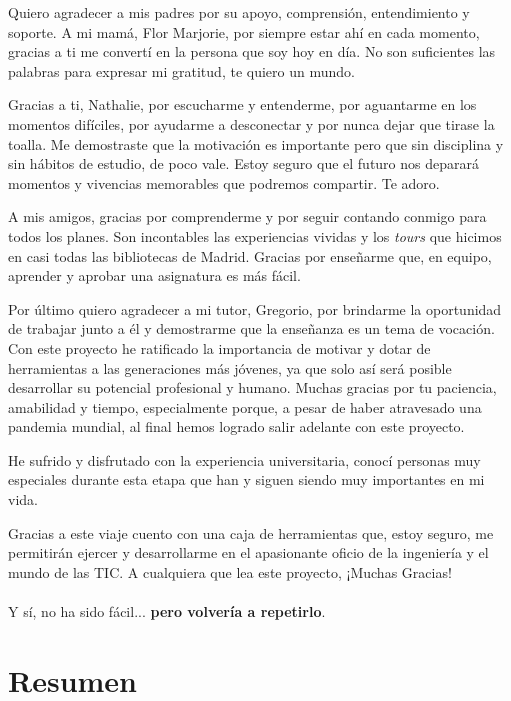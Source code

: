 \documentclass[a4paper, 12pt]{book}
\begin{document}
Quiero agradecer a mis padres por su apoyo, comprensión, entendimiento y soporte. A mi mamá, Flor Marjorie, por siempre estar ahí en cada momento, gracias a ti me convertí en la persona que soy hoy en día. No son suficientes las palabras para expresar mi gratitud, te quiero un mundo. 

Gracias a ti, Nathalie, por escucharme y entenderme, por aguantarme en los momentos difíciles, por ayudarme a desconectar y por nunca dejar que tirase la toalla. Me demostraste que la motivación es importante pero que sin disciplina y sin hábitos de estudio, de poco vale. Estoy seguro que el futuro nos deparará momentos y vivencias memorables que podremos compartir. Te adoro.

A mis amigos, gracias por comprenderme y por seguir contando conmigo para todos los planes. Son incontables las experiencias vividas y los \textit{tours} que hicimos en casi todas las bibliotecas de Madrid. Gracias por enseñarme que, en equipo, aprender y aprobar una asignatura es más fácil.

Por último quiero agradecer a mi tutor, Gregorio, por brindarme la oportunidad de trabajar junto a él y demostrarme que la enseñanza es un tema de vocación. Con este proyecto he ratificado la importancia de motivar y dotar de herramientas a las generaciones más jóvenes, ya que solo así será posible desarrollar su potencial profesional y humano. Muchas gracias por tu paciencia, amabilidad y tiempo, especialmente porque, a pesar de haber atravesado una pandemia mundial, al final hemos logrado salir adelante con este proyecto.

He sufrido y disfrutado con la experiencia universitaria, conocí personas muy especiales durante esta etapa que han y siguen siendo muy importantes en mi vida. 

Gracias a este viaje cuento con una caja de herramientas que, estoy seguro, me permitirán ejercer y desarrollarme en el apasionante oficio de la ingeniería y el mundo de las TIC.
A cualquiera que lea este proyecto, ¡Muchas Gracias!
\\\\
Y sí, no ha sido fácil... \textbf{pero volvería a repetirlo}.\\

\chapter*{Resumen}
\end{document}
